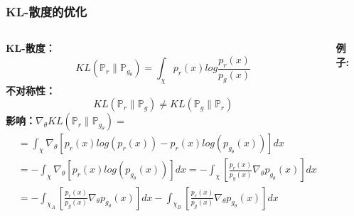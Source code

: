 \documentclass[xelatex]{beamer}
\begin{document}
\begin{frame}
  \frametitle{KL-散度的优化}
  \begin{columns}[t]
    \textbf{KL-散度：}
    $$
    KL \left (\mathbb{P}_r \parallel \mathbb{P}_{g_\theta} \right ) = \int_{\chi}p_r(x) log \frac{p_r(x)}{p_g(x)}
    $$
    \textbf{不对称性：}
    $$
    KL \left (\mathbb{P}_r \parallel \mathbb{P}_g \right ) \neq KL \left (\mathbb{P}_g \parallel \mathbb{P}_r \right )
    $$
    \textbf{影响：$\nabla_\theta KL \left (\mathbb{P}_r \parallel \mathbb{P}_{g_\theta} \right ) = $}
      \begin{equation*}\begin{split}
        & = \int_{\chi} \nabla_\theta \left [ p_r(x) log(p_r(x)) - p_r(x) log(p_{g_\theta}(x)) \right ]dx \\
                 & = -\int_{\chi} \nabla_\theta \left [p_r(x) log(p_{g_\theta}(x)) \right ]dx   = -\int_{\chi} \left [\frac{p_r(x)}{p_g(x)} \nabla_\theta p_{g_\theta}(x) \right]dx  \\
                 & = -\int_{\chi_A} \left [\frac{p_r(x)}{p_g(x)} \nabla_\theta p_{g_\theta}(x) \right]dx - \int_{\chi_B} \left [\frac{p_r(x)}{p_g(x)} \nabla_\theta p_{g_\theta}(x) \right]dx
      \end{split}
      \end{equation*}

    \textbf{例子:}
      \begin{figure}
      \includegraphics[width=0.65\linewidth]{kld}
      \end{figure}
  \end{columns}
\end{frame}
\end{document}
